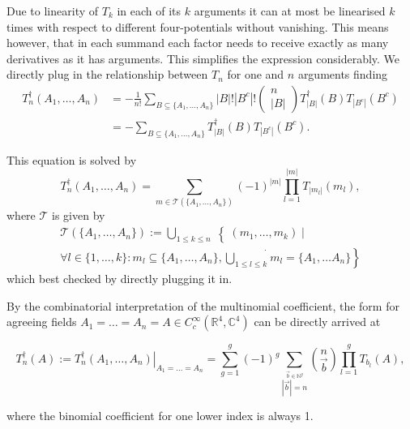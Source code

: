 \documentclass[oneside,reqno,12pt]{amsart}
\begin{document}
Due to linearity of \(T_k\) in each of its \(k\) arguments it can at most be linearised \(k\) times with respect to different four-potentials without vanishing. This means however, that in each summand each factor needs to receive exactly as many derivatives as it has arguments. This simplifies the expression considerably. We directly plug in the relationship between \(T_n\) for one and \(n\) arguments finding
\begin{align*}
T_n^\dagger(A_1,\dots, A_n) 
&= - \frac{1}{n!}  \sum_{B\subseteq \{A_1,\dots, A_n\}} |B|! |B^c|! \begin{pmatrix}n\\|B|\end{pmatrix} T^\dagger_{|B|}(B) T_{|B^c|}(B^c)\\
&= -   \sum_{B\subseteq \{A_1,\dots, A_n\}} T^\dagger_{|B|}(B) T_{|B^c|}(B^c).
\end{align*}

This equation is solved by
\begin{equation}
T_n^\dagger(A_1,\dots, A_n) = \sum_{m\in \mathcal{T}(\{A_1,\dots, A_n\})} (-1)^{|m|} \prod_{l=1}^{|m|} T_{|m_l|} (m_l),
\end{equation}
where \(\mathcal{T}\) is given by
\begin{align*}
\mathcal{T}(\{A_1,\dots, A_n\}):= \left.\bigcup_{1\le k \le n} \right\{ (m_1, \dots, m_k) \mid \\
\left.  \forall l\in \{1,\dots, k\}: m_l \subseteq \{A_1,\dots, A_n\}, \dot{\bigcup_{1\le l \le k}}m_l= \{A_1,\dots A_n\} \right\}
\end{align*}
which best checked by directly plugging it in.

By the combinatorial interpretation of the multinomial coefficient, the form for agreeing fields \(A_1=\dots =A_n=A\in C_c^\infty (\mathbb{R}^4,\mathbb{C}^4)\) can be directly arrived at

\begin{equation}
T_n^\dagger(A) := \left. T_n^\dagger(A_1,\dots, A_n)\right|_{A_1=\dots =A_n}= \sum_{g=1}^g (-1)^g \sum_{\stackrel{\vec{b}\in\mathbb{N}^g}{|\vec{b}|=n}} \binom{n}{\vec{b}} \prod_{l=1}^g T_{b_l} (A),
\end{equation}

where the binomial coefficient for one lower index is always 1.
\end{document}
